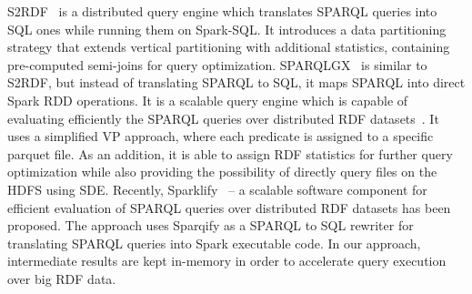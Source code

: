S2RDF~\cite{Schatzle:2016:SRQ:2977797.2977806} is a distributed query engine which translates SPARQL queries into SQL ones while running them on Spark-SQL. 
It introduces a data partitioning strategy that extends vertical partitioning with additional statistics, containing pre-computed semi-joins for query optimization.
SPARQLGX~\cite{sparqlgx-iswc-2016} is similar to S2RDF, but instead of translating SPARQL to SQL, it maps SPARQL into direct Spark RDD operations. 
It is a scalable query engine which is capable of evaluating efficiently the SPARQL queries over distributed RDF datasets~\cite{graux2018multi}.
It uses a simplified VP approach, where each predicate is assigned to a specific parquet file. 
As an addition, it is able to assign RDF statistics for further query optimization while also providing the possibility of directly query files on the HDFS using SDE.
Recently, Sparklify~\cite{2019-sansa-sparklify-iswc} -- a scalable software component for efficient evaluation of SPARQL queries over distributed RDF datasets has been proposed. 
The approach uses Sparqify as a SPARQL to SQL rewriter for translating SPARQL queries into Spark executable code.
In our approach, intermediate results are kept in-memory in order to accelerate query execution over big RDF data.
